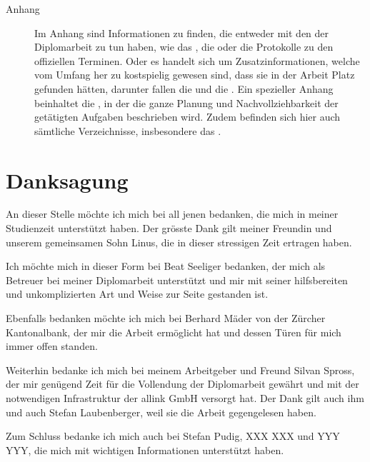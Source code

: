 \begin{description}
  \item[Anhang]
  
  Im Anhang sind Informationen zu finden, die entweder mit den
   der Diplomarbeit zu tun haben, wie das
  , die 
  oder die Protokolle zu den offiziellen Terminen. Oder es handelt sich um
  Zusatzinformationen, welche vom Umfang her zu kostspielig gewesen sind, dass
  sie in der Arbeit Platz gefunden hätten, darunter fallen die
   und die
  . Ein spezieller Anhang
  beinhaltet die , in der die ganze
  Planung und Nachvollziehbarkeit der getätigten Aufgaben beschrieben wird.
  Zudem befinden sich hier auch sämtliche Verzeichnisse, insbesondere das
  \bibname.
  
  \end{description}
  
  \section{Danksagung}
  
  An dieser Stelle möchte ich mich bei all jenen bedanken, die mich in meiner
  Studienzeit unterstützt haben. Der grösste Dank gilt meiner Freundin und
  unserem gemeinsamen Sohn Linus, die in dieser stressigen Zeit ertragen haben.
  
  Ich möchte mich in dieser Form bei Beat Seeliger bedanken, der mich als
  Betreuer bei meiner Diplomarbeit unterstützt und mir mit seiner hilfsbereiten
  und unkomplizierten Art und Weise zur Seite gestanden ist.
  
  Ebenfalls bedanken möchte ich mich bei Berhard Mäder von der Zürcher
  Kantonalbank, der mir die Arbeit ermöglicht hat und dessen Türen für mich
  immer offen standen.
  
  Weiterhin bedanke ich mich bei meinem Arbeitgeber und Freund Silvan Spross,
  der mir genügend Zeit für die Vollendung der Diplomarbeit gewährt und mit der
  notwendigen Infrastruktur der allink GmbH versorgt hat. Der Dank gilt
  auch ihm und auch Stefan Laubenberger, weil sie die Arbeit gegengelesen
  haben.
  
  Zum Schluss bedanke ich mich auch bei Stefan Pudig, XXX XXX und YYY YYY, die
  mich mit wichtigen Informationen unterstützt haben.
    